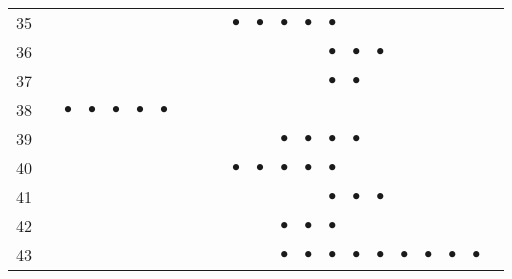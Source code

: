 \documentclass[text.tex]{subfiles}
\begin{document}
{\begin{center}
\begin{longtable}{l|ccccccccccccccccccccc}
35  &           &           &           &           &           &           &           &           &           & $\bullet$ & $\bullet$ & $\bullet$ & $\bullet$ & $\bullet$ &           &           &           &           &           &           &           \\
36  &           &           &           &           &           &           &           &           &           &           &           &           &           & $\bullet$ & $\bullet$ & $\bullet$ &           &           &           &           &           \\
37  &           &           &           &           &           &           &           &           &           &           &           &           &           & $\bullet$ & $\bullet$ &           &           &           &           &           &           \\
38  &           & $\bullet$ & $\bullet$ & $\bullet$ & $\bullet$ & $\bullet$ &           &           &           &           &           &           &           &           &           &           &           &           &           &           &           \\
39  &           &           &           &           &           &           &           &           &           &           &           & $\bullet$ & $\bullet$ & $\bullet$ & $\bullet$ &           &           &           &           &           &           \\
40  &           &           &           &           &           &           &           &           &           & $\bullet$ & $\bullet$ & $\bullet$ & $\bullet$ & $\bullet$ &           &           &           &           &           &           &           \\
41  &           &           &           &           &           &           &           &           &           &           &           &           &           & $\bullet$ & $\bullet$ & $\bullet$ &           &           &           &           &           \\
42  &           &           &           &           &           &           &           &           &           &           &           & $\bullet$ & $\bullet$ & $\bullet$ &           &           &           &           &           &           &           \\ 
43  &           &           &           &           &           &           &           &           &           &           &           & $\bullet$ & $\bullet$ & $\bullet$ & $\bullet$ & $\bullet$ & $\bullet$ & $\bullet$ & $\bullet$ & $\bullet$ &           \\

\end{longtable}
\end{center}}
\end{document}
